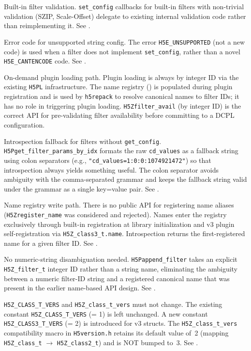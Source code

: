 \documentclass[../RFC-HDFG-2026-001.tex]{subfiles}
\begin{document}
Built-in filter validation. \texttt{set\_config} callbacks for built-in
filters with non-trivial validation (SZIP, Scale-Offset) delegate to existing
internal validation code rather than reimplementing it. See
.

Error code for unsupported string config. The error
\texttt{H5E\_UNSUPPORTED} (not a new code) is used when a filter does not implement
\texttt{set\_config}, rather than a novel \texttt{H5E\_CANTENCODE} code. See
.

On-demand plugin loading path. Plugin loading is always by integer ID via
the existing \texttt{H5PL} infrastructure. The name registry
() is populated during plugin registration and
is used by \texttt{h5repack} to resolve canonical names to filter IDs; it has
no role in triggering plugin loading.
\texttt{H5Zfilter\_avail} (by integer ID) is the correct API for pre-validating
filter availability before committing to a DCPL configuration.

Introspection fallback for filters without \texttt{get\_config}.
\texttt{H5Pget\_filter\_params\_by\_idx} formats the raw \texttt{cd\_values} as a fallback
string using colon separators (e.g., \texttt{"cd\_values=1:0:0:1074921472"}) so that
introspection always yields something useful. The colon separator avoids
ambiguity with the comma-separated grammar and keeps the fallback string valid
under the grammar as a single key=value pair. See .

Name registry write path. There is no public API for registering name aliases
(\texttt{H5Zregister\_name} was considered and rejected). Names enter the registry
exclusively through built-in registration at library initialization and v3
plugin self-registration via \texttt{H5Z\_class3\_t.name}. Introspection returns the
first-registered name for a given filter ID. See .

No numeric-string disambiguation needed. \texttt{H5Pappend\_filter} takes an
explicit \texttt{H5Z\_filter\_t} integer ID rather than a string name, eliminating
the ambiguity between a numeric filter-ID string and a registered canonical
name that was present in the earlier name-based API design. See
.

\texttt{H5Z\_CLASS\_T\_VERS} and \texttt{H5Z\_class\_t\_vers} must not change. The
existing constant \texttt{H5Z\_CLASS\_T\_VERS} (= 1) is left unchanged. A new constant
\texttt{H5Z\_CLASS3\_T\_VERS} (= 2) is introduced for v3 structs. The
\texttt{H5Z\_class\_t\_vers} compatibility macro in \texttt{H5version.h} retains its default
value of~2 (mapping \texttt{H5Z\_class\_t} $\rightarrow$ \texttt{H5Z\_class2\_t}) and is NOT
bumped to~3. See .
\end{document}
